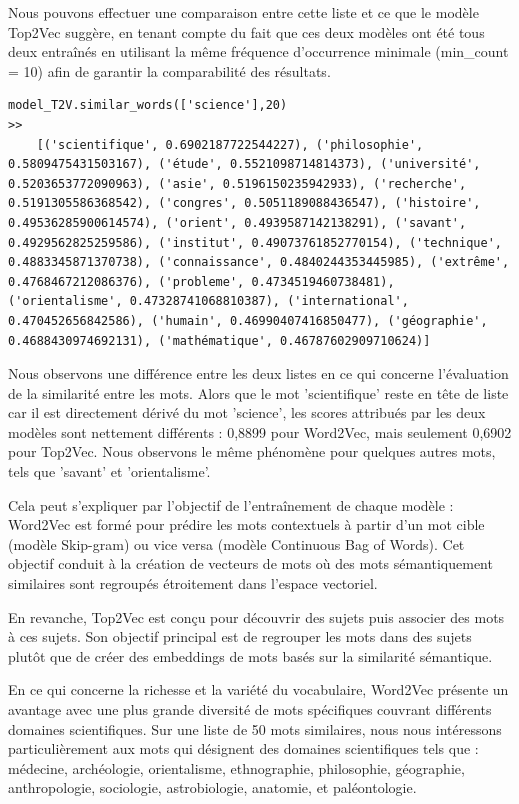 Nous pouvons effectuer une comparaison entre cette liste et ce que le modèle Top2Vec suggère, en tenant compte du fait que ces deux modèles ont été tous deux entraînés en utilisant la même fréquence d'occurrence minimale (min\_count = 10) afin de garantir la comparabilité des résultats.

\begin{lstlisting}
model_T2V.similar_words(['science'],20)
>>
    [('scientifique', 0.6902187722544227), ('philosophie', 0.5809475431503167), ('étude', 0.5521098714814373), ('université', 0.5203653772090963), ('asie', 0.5196150235942933), ('recherche', 0.5191305586368542), ('congres', 0.5051189088436547), ('histoire', 0.49536285900614574), ('orient', 0.4939587142138291), ('savant', 0.4929562825259586), ('institut', 0.49073761852770154), ('technique', 0.4883345871370738), ('connaissance', 0.4840244353445985), ('extrême', 0.4768467212086376), ('probleme', 0.4734519460738481), ('orientalisme', 0.47328741068810387), ('international', 0.470452656842586), ('humain', 0.46990407416850477), ('géographie', 0.4688430974692131), ('mathématique', 0.46787602909710624)]
\end{lstlisting}
Nous observons une différence entre les deux listes en ce qui concerne l'évaluation de la similarité entre les mots. Alors que le mot 'scientifique' reste en tête de liste car il est directement dérivé du mot 'science', les scores attribués par les deux modèles sont nettement différents : 0,8899 pour Word2Vec, mais seulement 0,6902 pour Top2Vec. Nous observons le même phénomène pour quelques autres mots, tels que 'savant' et 'orientalisme'.

Cela peut s'expliquer par l'objectif de l'entraînement de chaque modèle : Word2Vec est formé pour prédire les mots contextuels à partir d'un mot cible (modèle Skip-gram) ou vice versa (modèle Continuous Bag of Words). Cet objectif conduit à la création de vecteurs de mots où des mots sémantiquement similaires sont regroupés étroitement dans l'espace vectoriel.

En revanche, Top2Vec est conçu pour découvrir des sujets puis associer des mots à ces sujets. Son objectif principal est de regrouper les mots dans des sujets plutôt que de créer des embeddings de mots basés sur la similarité sémantique.

En ce qui concerne la richesse et la variété du vocabulaire, Word2Vec présente un avantage avec une plus grande diversité de mots spécifiques couvrant différents domaines scientifiques. Sur une liste de 50 mots similaires, nous nous intéressons particulièrement aux mots qui désignent des domaines scientifiques tels que : médecine, archéologie, orientalisme, ethnographie, philosophie, géographie, anthropologie, sociologie, astrobiologie, anatomie, et paléontologie.

